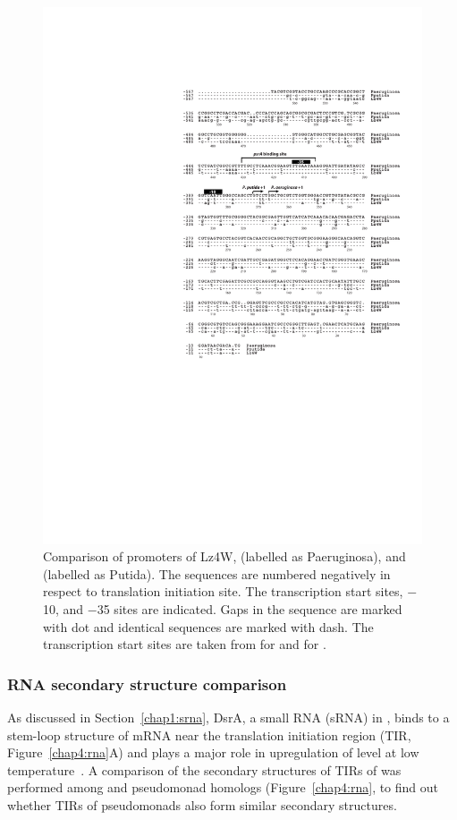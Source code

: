 \begin{figure}
\includegraphics{figures/chap4_promoters}
\caption[Comparison of  promoters]{Comparison of 
promoters of Lz4W,  (labelled as Paeruginosa), and  (labelled as Putida). The sequences are numbered
negatively in respect to translation initiation site. The
transcription start sites, $-$10, and $-$35 sites are indicated.
Gaps in the sequence are marked with dot and identical sequences
are marked with dash. The transcription start sites are taken from
\citet{Tanaka1994} for  and \citet{Kojic2002} for .} \label{chap4:promoters}
\end{figure}

\subsubsection{RNA secondary structure comparison}
\label{secondary} As discussed in Section~\ref{chap1:srna}, DsrA,
a small RNA (sRNA) in , binds to a stem-loop structure of
 mRNA near the translation initiation region (TIR,
Figure~\ref{chap4:rna}A) and plays a major role in upregulation of
\sigs{} level at low
temperature~\citep{Lease2000,Lease2000b,Lease1998,Majdalani1998}.
A comparison of the secondary structures of TIRs of  was
performed among  and pseudomonad homologs
(Figure~\ref{chap4:rna}, to find out whether TIRs of pseudomonads
also form similar secondary structures.

